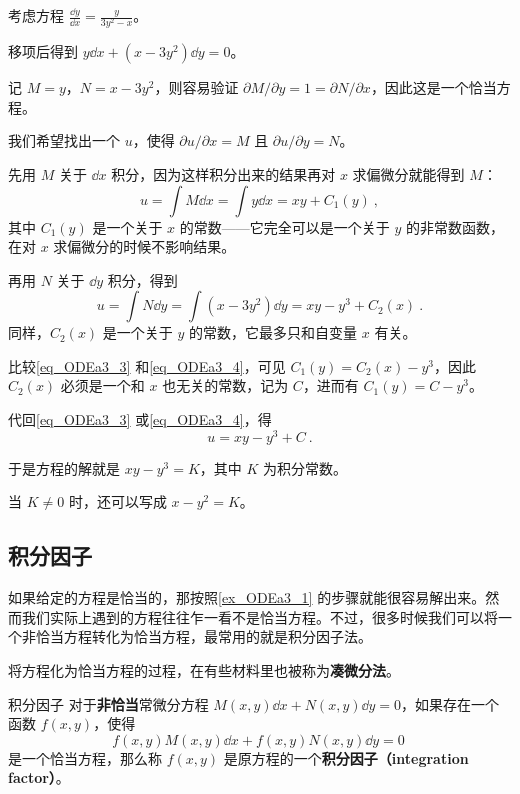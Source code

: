 \begin{example}{}\label{ex_ODEa3_1}
考虑方程 $\frac{\dd y}{\dd x}=\frac{y}{3y^2-x}$。

移项后得到 $y\dd x+(x-3y^2)\dd y=0$。

记 $M=y$，$N=x-3y^2$，则容易验证 $\partial M/\partial y= 1 =\partial N/\partial x$，因此这是一个恰当方程。

我们希望找出一个 $u$，使得 $\partial u/\partial x=M$ 且 $\partial u/\partial y=N$。

先用 $M$ 关于 $\dd x$ 积分，因为这样积分出来的结果再对 $x$ 求偏微分就能得到 $M$：
\begin{equation}\label{eq_ODEa3_3}
u=\int M\dd x=\int y\dd x=xy+C_1(y)~,
\end{equation}
其中 $C_1(y)$ 是一个关于 $x$ 的常数——它完全可以是一个关于 $y$ 的非常数函数，在对 $x$ 求偏微分的时候不影响结果。

再用 $N$ 关于 $\dd y$ 积分，得到
\begin{equation}\label{eq_ODEa3_4}
u=\int N\dd y=\int (x-3y^2)\dd y=xy-y^3+C_2(x)~.
\end{equation}
同样，$C_2(x)$ 是一个关于 $y$ 的常数，它最多只和自变量 $x$ 有关。

比较\autoref{eq_ODEa3_3} 和\autoref{eq_ODEa3_4}，可见 $C_1(y)=C_2(x)-y^3$，因此 $C_2(x)$ 必须是一个和 $x$ 也无关的常数，记为 $C$，进而有 $C_1(y)=C-y^3$。

代回\autoref{eq_ODEa3_3} 或\autoref{eq_ODEa3_4}，得
\begin{equation}
u=xy-y^3+C~.
\end{equation}

于是方程的解就是 $xy-y^3=K$，其中 $K$ 为积分常数。

当 $K\not=0$ 时，还可以写成 $x-y^2=K$。

\end{example}


\subsection{积分因子}

如果给定的方程是恰当的，那按照\autoref{ex_ODEa3_1} 的步骤就能很容易解出来。然而我们实际上遇到的方程往往乍一看不是恰当方程。不过，很多时候我们可以将一个非恰当方程转化为恰当方程，最常用的就是积分因子法。

将方程化为恰当方程的过程，在有些材料里也被称为\textbf{凑微分法}。

\begin{definition}{积分因子}
对于\textbf{非恰当}常微分方程 $M(x, y)\dd x+N(x, y)\dd y=0$，如果存在一个函数 $f(x, y)$，使得
\begin{equation}\label{eq_ODEa3_5}
f(x, y)M(x, y)\dd x+f(x, y)N(x, y)\dd y=0~
\end{equation}
是一个恰当方程，那么称 $f(x, y)$ 是原方程的一个\textbf{积分因子（integration factor）}。
\end{definition}

